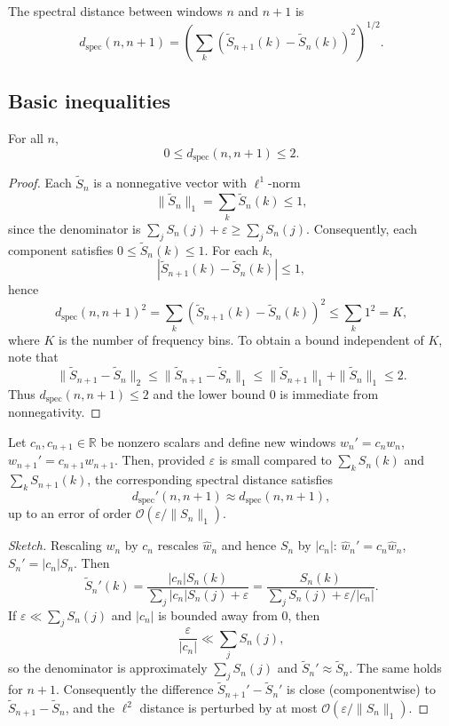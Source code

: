 \documentclass[11pt]{article}
\begin{document}
The spectral distance between windows $n$ and $n+1$ is
\[
d_{\text{spec}}(n,n+1) = \left( \sum_{k} \left( \tilde{S}_{n+1}(k) - \tilde{S}_n(k) \right)^2 \right)^{1/2}.
\]

\subsection{Basic inequalities}

\begin{lemma}[Boundedness]
For all $n$, 
\[
0 \le d_{\text{spec}}(n,n+1) \le 2.
\]
\end{lemma}

\begin{proof}
Each $\tilde{S}_n$ is a nonnegative vector with $\ell^1$-norm
\[
\|\tilde{S}_n\|_1 = \sum_k \tilde{S}_n(k) \le 1,
\]
since the denominator is $\sum_j S_n(j) + \varepsilon \ge \sum_j S_n(j)$. Consequently, each component satisfies $0\le \tilde{S}_n(k)\le 1$. For each $k$,
\[
|\tilde{S}_{n+1}(k) - \tilde{S}_n(k)| \le 1,
\]
hence
\[
d_{\text{spec}}(n,n+1)^2 = \sum_k (\tilde{S}_{n+1}(k) - \tilde{S}_n(k))^2 \le \sum_k 1^2 = K,
\]
where $K$ is the number of frequency bins. To obtain a bound independent of $K$, note that
\[
\|\tilde{S}_{n+1} - \tilde{S}_n\|_2 \le \|\tilde{S}_{n+1} - \tilde{S}_n\|_1 \le \|\tilde{S}_{n+1}\|_1 + \|\tilde{S}_n\|_1 \le 2.
\]
Thus $d_{\text{spec}}(n,n+1) \le 2$ and the lower bound $0$ is immediate from nonnegativity.
\end{proof}

\begin{lemma}
Let $c_n, c_{n+1} \in \mathbb{R}$ be nonzero scalars and define new windows $w_n' = c_n w_n$, $w_{n+1}' = c_{n+1} w_{n+1}$. Then, provided $\varepsilon$ is small compared to $\sum_k S_n(k)$ and $\sum_k S_{n+1}(k)$, the corresponding spectral distance satisfies
\[
d_{\text{spec}}'(n,n+1) \approx d_{\text{spec}}(n,n+1),
\]
up to an error of order $\mathcal{O}(\varepsilon/\|S_n\|_1)$.
\end{lemma}

\begin{proof}[Sketch]
Rescaling $w_n$ by $c_n$ rescales $\hat{w}_n$ and hence $S_n$ by $|c_n|$: $\hat{w}_n' = c_n \hat{w}_n$, $S_n' = |c_n| S_n$. Then
\[
\tilde{S}_n'(k) = \frac{|c_n| S_n(k)}{\sum_j |c_n| S_n(j) + \varepsilon} = 
\frac{S_n(k)}{\sum_j S_n(j) + \varepsilon/|c_n|}.
\]
If $\varepsilon \ll \sum_j S_n(j)$ and $|c_n|$ is bounded away from $0$, then
\[
\frac{\varepsilon}{|c_n|} \ll \sum_j S_n(j),
\]
so the denominator is approximately $\sum_j S_n(j)$ and $\tilde{S}_n' \approx \tilde{S}_n$. The same holds for $n+1$. Consequently the difference $\tilde{S}_{n+1}' - \tilde{S}_n'$ is close (componentwise) to $\tilde{S}_{n+1} - \tilde{S}_n$, and the $\ell^2$ distance is perturbed by at most $\mathcal{O}(\varepsilon/\|S_n\|_1)$.
\end{proof}
\end{document}
